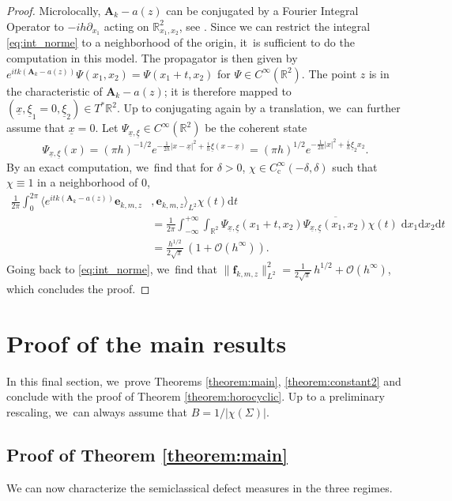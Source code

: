 \documentclass[10pt]{amsart}
\newcommand{\bA}{\boldsymbol{A}}
\newcommand{\bme}{\boldsymbol{e}}
\newcommand{\bmf}{\boldsymbol{f}}
\theoremstyle{plain}
\theoremstyle{definition}
\let\con\overline
\let\mc\mathcal
\newcommand{\R}{\mathbb{R}}
\newcommand{\dd}{\mathrm{d}}
\DeclareMathOperator{\comp}{c}
\newcommand{\bigo}{\mathcal{O}}
\begin{document}
\begin{proof}
Microlocally, $\bA_k-a(z)$ can be conjugated by a
Fourier Integral Operator to $-ih\partial_{x_1}$ acting on
$\R^2_{x_1, x_2}$, see \cite[Th.\,12.3]{Zworski-12}. Since we can restrict the integral \eqref{eq:int_norme} to a
neighborhood of the origin, it~is sufficient to do the computation in this
model. The propagator is then given by $e^{itk(\bA_k-a(z))} \Psi (x_1, x_2) = \Psi (x_1 +t, x_2)$ for $\Psi \in C^\infty(\R^2)$. The point $z$ is in the characteristic of $\bA_k-a(z)$; it is therefore mapped to \hbox{$(\underline{x}, \underline{\xi}_1=0,\underline{\xi}_2) \in T^*\R^2$}. Up to conjugating again by a translation, we~can further assume that $\underline{x}=0$. Let
$\Psi_{\underline{x}, \underline{\xi}} \in C^\infty (\R^2)$ be
the coherent state
\[
\Psi_{\underline{x}, \underline{\xi}} (x) = (\pi h)^{-1/2} e^{ -
\frac{1}{2h} | x - \underline{x}|^2 + \frac{i}{h} \underline{\xi} (x - \underline{x}) } = (\pi h)^{1/2}e^{ -
\frac{1}{2h} | x|^2 + \frac{i}{h} \underline{\xi}_2 x_2 }.\]
By an exact computation, we~find that for $\delta > 0$, $\chi \in C^\infty_{{\comp}}(-\delta,\delta)$ such that $\chi \equiv 1$ in a neighborhood of $0$,
\[
\begin{split} \frac{1}{2 \pi } \int_0^{2 \pi } \langle e^{itk(\bA_k-a(z))} \bme_{k,m,z}&,\bme_{k,m,z} \rangle_{L^2} \chi(t)  \dd t \\
& = \frac{1}{2\pi} \int_{-\infty}^{+\infty} \int_{\R^2} \Psi _{ \underline{x},
\underline{\xi} } (x_1 + t, x_2) \con { \Psi_{ \underline{x}, \underline{\xi} } (x_1,
x_2)} \chi(t) \; \dd x_1 \dd x_2 \dd t \\
& = \frac{ h^{1/2}}{2 \sqrt \pi }\,(1+ \mc{O}(h^\infty)).
\end{split}
\]
Going back to \eqref{eq:int_norme}, we~find that $ \|\bmf_{k,m,z}\|^2_{L^2} =
\tfrac{1}{ 2 \sqrt \pi}\, h^{1/2} + \bigo (h^{\infty})$, which
concludes the proof.
\end{proof}

\section{Proof of the main results}

\label{section:proofs}

In this final section, we~prove Theorems \ref{theorem:main}, \ref{theorem:constant2} and conclude with the proof of Theorem \ref{theorem:horocyclic}. Up to a preliminary rescaling, we~can always assume that $B=1/|\chi(\Sigma)|$.

\subsection{Proof of Theorem \ref{theorem:main}} We can now characterize the semiclassical defect measures in the three regimes.
\end{document}
